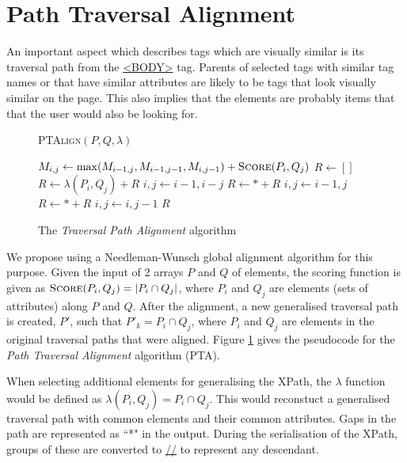 \section{Path Traversal Alignment}
An important aspect which describes tags which are visually similar is its traversal path from the \url{<BODY>} tag. Parents of selected tags with similar tag names or that have similar attributes are likely to be tags that look visually similar on the page. This also implies that the elements are probably items that that the user would also be looking for.

\begin{figure}[htbp]
\singlespacing
	\begin{algorithm}[H]
	\caption{\textsc{PTAlign}$(P,Q,\lambda)$}
	\begin{algorithmic}[1]
				\STATE $M_{i,j} \leftarrow \max(M_{i-1,j},M_{i-1,j-1},M_{i,j-1}) + \textsc{Score}(P_i,Q_j)$
			\ENDFOR	
		\ENDFOR
		\STATE $R \leftarrow []$
				\STATE $R \leftarrow \lambda(P_i,Q_j) + R$
				\STATE $i,j \leftarrow i-1,i-j$
				\STATE $R \leftarrow * + R$
				\STATE $i,j \leftarrow i-1,j$
				\STATE $R \leftarrow * + R$
				\STATE $i,j \leftarrow i,j-1$
	    	\ENDIF	
		\ENDWHILE
		\RETURN $R$
	\end{algorithmic}
	\end{algorithm}
\caption{The \textit{Traversal Path Alignment} algorithm}
\label{fig:lcas}
\end{figure}

We propose using a Needleman-Wunsch global alignment algorithm for this purpose. Given the input of 2 arrays $P$ and $Q$ of elements, the scoring function is given as $\textsc{Score}(P_i,Q_j) = |P_i \cap Q_j|$, where $P_i$ and $Q_j$ are elements (sets of attributes) along $P$ and $Q$. After the alignment, a new generalised traversal path is created, $P'$, such that $P'_k = P_i \cap Q_j$, where $P_i$ and $Q_j$ are elements in the original traversal paths that were aligned. Figure \ref{fig:lcas} gives the pseudocode for the \textit{Path Traversal Alignment} algorithm (PTA).


When selecting additional elements for generalising the XPath, the $\lambda$ function would be defined as $\lambda(P_i,Q_j) = P_i \cap Q_j$. This would reconstuct a generalised traversal path with common elements and their common attributes. Gaps in the path are represented as ``*" in the output. During the serialisation of the XPath, groups of these are converted to \url{//} to represent any descendant.

